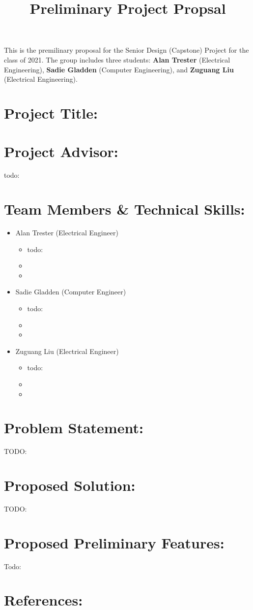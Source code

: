 \documentclass[]{article}
\title{Preliminary Project Propsal}
\begin{document}
\maketitle

This is the premilinary proposal for the Senior Design (Capstone) Project for the class of 2021. The group includes three students: \textbf{Alan Trester} (Electrical Engineering), \textbf{Sadie Gladden} (Computer Engineering), and \textbf{Zuguang Liu} (Electrical Engineering).


\section{Project Title:}
	
	
\section{Project Advisor:}
	todo:

\section{Team Members \& Technical Skills:}
\begin{itemize}
	\item Alan Trester (Electrical Engineer)
	\begin{itemize}
		\item  todo:
		\item  
		\item  
	\end{itemize}

	\item Sadie Gladden (Computer Engineer)
	\begin{itemize}
		\item todo:
		\item  
		\item  
	\end{itemize}

	\item Zuguang Liu (Electrical Engineer)
	\begin{itemize}
		\item  todo:
		\item  
		\item 
	\end{itemize}
\end{itemize}

\section{Problem Statement:}
	TODO:

\section{Proposed Solution:}
	TODO: 

\section{Proposed Preliminary Features:}
	Todo:

\section{References:}
\end{document}
